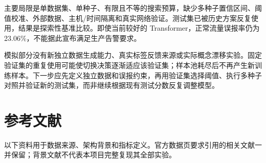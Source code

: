 \documentclass[UTF8,a4paper,11pt,fontset=fandol]{ctexart}
\begin{document}
主要局限是单数据集、单种子、有限且不等的搜索预算，缺少多种子置信区间、阈值校准、外部数据、主机/时间隔离和真实网络验证。测试集已被历史方案反复使用，结果是探索性基准比较。即使当前较好的
Transformer，正常流量误报率仍为 23.06\%，不能据此宣布满足生产告警要求。

模拟部分没有新独立数据生成能力、真实标签反馈来源或实际概念漂移实验。固定验证集的重复使用可能使切换决策逐渐适应该验证集；样本池耗尽后不再产生新训练样本。下一步应先定义独立数据和误报约束，再用验证集选择阈值、执行多种子对照并验证新的测试集，而非继续根据现有测试分数反复调整模型。

\clearpage

\section{参考文献}\label{ux53c2ux8003ux6587ux732e}

以下资料用于数据来源、架构背景和指标定义。官方数据页要求引用的相关文献一并保留；背景文献不代表本项目完整复现其全部实验。
\end{document}
